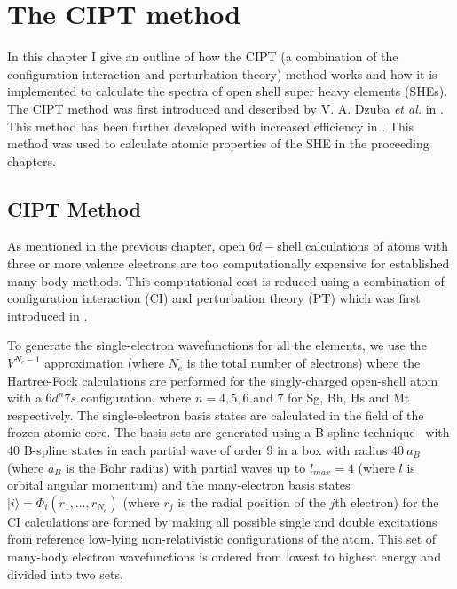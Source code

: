 \documentclass[10pt,a4paper, twoside, openright]{report}
\begin{document}
\chapter{The CIPT method} \label{chap:CIPT}
In this chapter I give an outline of how the CIPT (a combination of the configuration interaction and perturbation theory) method works and how it is implemented to calculate the spectra of open shell super heavy elements (SHEs). The CIPT method was first introduced and described by V. A. Dzuba \textit{et al.} in \cite{DBHF2017}. This method has been further developed with increased efficiency in \cite{FCI}. This method was used to calculate atomic properties of the SHE in the proceeding chapters.
\iffalse
\section{CIPT Method} \label{sec:CIPT}

As mentioned in the previous chapter, open $6d-$shell calculations of atoms with  three or more valence electrons are too computationally expensive for established many-body methods. This computational cost is reduced using a combination of configuration interaction (CI) and perturbation theory (PT) which was first introduced in \cite{DBHF2017}. 

To generate the single-electron wavefunctions for all the elements,  we use the $V^{N_e-1}$ approximation (where $N_e$ is the total number of electrons) \cite{Kelly1964, Dzuba2005} where the Hartree-Fock calculations are performed for the singly-charged open-shell atom with a   $6d^n7s$ configuration, where $n=4,5,6$ and $7$ for Sg, Bh, Hs and Mt respectively. The  single-electron basis states are calculated in the field of the frozen atomic core. The basis sets are generated using a  B-spline technique~\cite{Johnson1988}  with 40 B-spline states in each partial wave of order 9 in a box with radius $40 \ a_B$ (where $a_B$ is the Bohr radius) with partial waves up to $l_{max}=4$ (where $l$ is orbital angular momentum) and the many-electron basis states $|i \rangle = \Phi_i(r_1,\dots,r_{N_e})$ (where $r_j$ is the radial position of the $j$th electron)  for the CI calculations are formed by making all possible single and double excitations from reference low-lying non-relativistic configurations of the atom. This set of many-body electron wavefunctions is ordered from lowest to highest energy and divided into two sets, 
\end{document}

